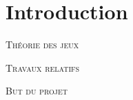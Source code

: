 
\section{Introduction}

\textsc{Théorie des jeux} 

\textsc{Travaux relatifs} 

\textsc{But du projet}